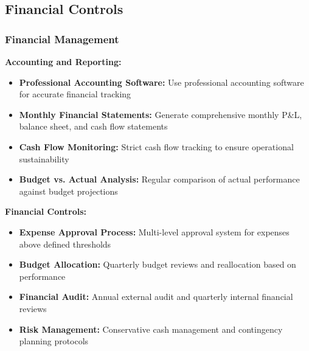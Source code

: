 \subsection{Financial Controls}
\subsubsection{Financial Management}
\textbf{Accounting and Reporting:}
\begin{itemize}
    \item \textbf{Professional Accounting Software:} Use professional accounting software for accurate financial tracking
    \item \textbf{Monthly Financial Statements:} Generate comprehensive monthly P\&L, balance sheet, and cash flow statements
    \item \textbf{Cash Flow Monitoring:} Strict cash flow tracking to ensure operational sustainability
    \item \textbf{Budget vs. Actual Analysis:} Regular comparison of actual performance against budget projections
\end{itemize}

\textbf{Financial Controls:}
\begin{itemize}
    \item \textbf{Expense Approval Process:} Multi-level approval system for expenses above defined thresholds
    \item \textbf{Budget Allocation:} Quarterly budget reviews and reallocation based on performance
    \item \textbf{Financial Audit:} Annual external audit and quarterly internal financial reviews
    \item \textbf{Risk Management:} Conservative cash management and contingency planning protocols
\end{itemize}

